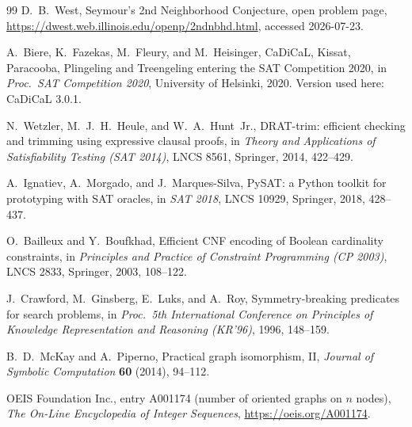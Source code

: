 \documentclass[11pt]{article}
\begin{document}
\begin{thebibliography}{99}
 D.~B.~West, Seymour's 2nd Neighborhood Conjecture, open
problem page, \url{https://dwest.web.illinois.edu/openp/2ndnbhd.html},
accessed 2026-07-23.

 A.~Biere, K.~Fazekas, M.~Fleury, and M.~Heisinger,
CaDiCaL, Kissat, Paracooba, Plingeling and Treengeling entering the SAT
Competition 2020, in \emph{Proc.\ SAT Competition 2020}, University of
Helsinki, 2020. Version used here: CaDiCaL 3.0.1.

 N.~Wetzler, M.~J.~H.~Heule, and W.~A.~Hunt~Jr.,
DRAT-trim: efficient checking and trimming using expressive clausal
proofs, in \emph{Theory and Applications of Satisfiability Testing (SAT
2014)}, LNCS 8561, Springer, 2014, 422--429.

 A.~Ignatiev, A.~Morgado, and J.~Marques-Silva, PySAT: a
Python toolkit for prototyping with SAT oracles, in \emph{SAT 2018}, LNCS
10929, Springer, 2018, 428--437.

 O.~Bailleux and Y.~Boufkhad, Efficient CNF encoding
of Boolean cardinality constraints, in \emph{Principles and Practice of
Constraint Programming (CP 2003)}, LNCS 2833, Springer, 2003, 108--122.

 J.~Crawford, M.~Ginsberg, E.~Luks, and A.~Roy,
Symmetry-breaking predicates for search problems, in \emph{Proc.\ 5th
International Conference on Principles of Knowledge Representation and
Reasoning (KR'96)}, 1996, 148--159.

 B.~D.~McKay and A.~Piperno, Practical graph isomorphism,
II, \emph{Journal of Symbolic Computation} \textbf{60} (2014), 94--112.

 OEIS Foundation Inc., entry A001174 (number of oriented
graphs on $n$ nodes), \emph{The On-Line Encyclopedia of Integer
Sequences}, \url{https://oeis.org/A001174}.

\end{thebibliography}
\end{document}
